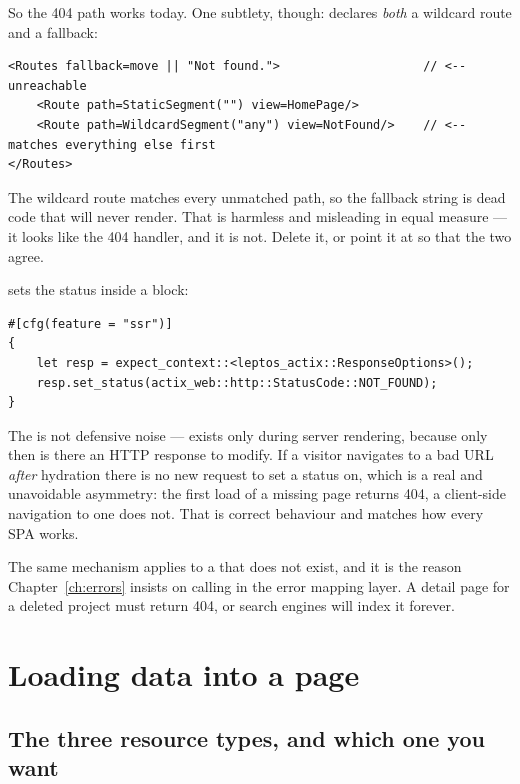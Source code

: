 So the 404 path works today. One subtlety, though:  declares
\emph{both} a wildcard route and a  fallback:

\begin{lstlisting}[style=rs]
<Routes fallback=move || "Not found.">                    // <-- unreachable
    <Route path=StaticSegment("") view=HomePage/>
    <Route path=WildcardSegment("any") view=NotFound/>    // <-- matches everything else first
</Routes>
\end{lstlisting}

The wildcard route matches every unmatched path, so the fallback string is dead code that will
never render. That is harmless and misleading in equal measure --- it looks like the 404 handler,
and it is not. Delete it, or point it at  so that the two agree.

 sets the status inside a  block:

\begin{lstlisting}[style=rs]
#[cfg(feature = "ssr")]
{
    let resp = expect_context::<leptos_actix::ResponseOptions>();
    resp.set_status(actix_web::http::StatusCode::NOT_FOUND);
}
\end{lstlisting}

The  is not defensive noise ---  exists only during server
rendering, because only then is there an HTTP response to modify. If a visitor navigates to a bad
URL \emph{after} hydration there is no new request to set a status on, which is a real and
unavoidable asymmetry: the first load of a missing page returns 404, a client-side navigation to one
does not. That is correct behaviour and matches how every SPA works.

The same mechanism applies to a  that does not exist, and it is the reason
Chapter~\ref{ch:errors} insists on calling  in the error mapping layer. A detail
page for a deleted project must return 404, or search engines will index it forever.

\chapter{Loading data into a page}
\label{ch:loading}

\section{The three resource types, and which one you want}

